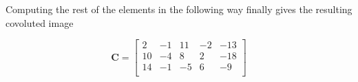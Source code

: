 \documentclass{article}
\begin{document}
Computing the rest of the elements in the following way finally gives the resulting covoluted image

\begin{equation}
    \mathbf{C} = \begin{bmatrix}
    2 &-1 & 11 &-2 &-13 \\
    10&-4 & 8 &2 &-18\\
    14 &-1 &-5 &6 &-9 \\
    \end{bmatrix}
\end{equation}

\end{document}
